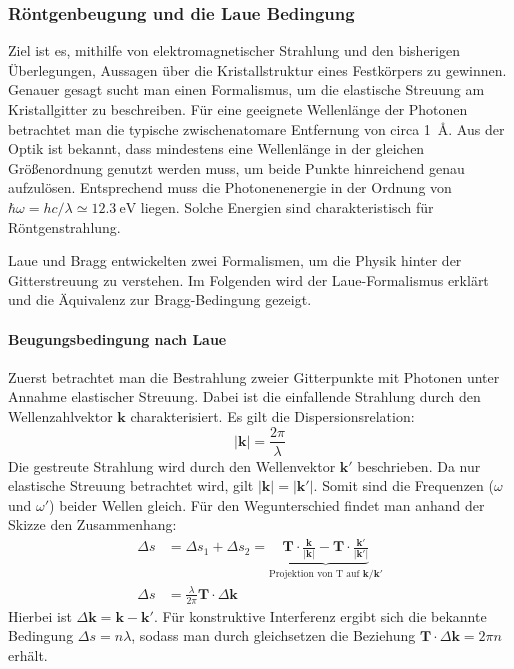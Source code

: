 \subsubsection{Röntgenbeugung und die Laue Bedingung}
Ziel ist es, mithilfe von elektromagnetischer Strahlung und den bisherigen Überlegungen, Aussagen über die Kristallstruktur
eines Festkörpers zu gewinnen.
Genauer gesagt sucht man einen Formalismus, um die elastische Streuung am Kristallgitter zu beschreiben.
Für eine geeignete Wellenlänge der Photonen betrachtet man die typische zwischenatomare Entfernung von circa
\qty{1}{\angstrom}.
Aus der Optik ist bekannt, dass mindestens eine Wellenlänge in der gleichen Größenordnung genutzt werden
muss, um beide Punkte hinreichend genau aufzulösen.
Entsprechend muss die Photonenenergie in der Ordnung von
$\hbar \omega=hc / \lambda \simeq \qty{12.3}{\electronvolt}$ liegen.
Solche Energien sind charakteristisch für Röntgenstrahlung.
\autocite[115]{Ashcroft}

Laue und Bragg entwickelten zwei Formalismen, um die Physik hinter der Gitterstreuung zu verstehen. Im Folgenden wird der
Laue-Formalismus erklärt und die Äquivalenz zur Bragg-Bedingung gezeigt.

\paragraph{Beugungsbedingung nach Laue}
Zuerst betrachtet man die Bestrahlung zweier Gitterpunkte mit Photonen unter Annahme elastischer Streuung.
Dabei ist die einfallende Strahlung durch den Wellenzahlvektor  $\mathbf{k}$ charakterisiert.
Es gilt die Dispersionsrelation:
\begin{equation*}
    \lvert \mathbf{k} \rvert =\frac{2\pi}{\lambda}
\end{equation*}
Die gestreute Strahlung wird durch den Wellenvektor $\mathbf{k}'$ beschrieben.
Da nur elastische Streuung betrachtet wird, gilt $\lvert \mathbf{k} \rvert=\lvert \mathbf{k}' \rvert$.
Somit sind die Frequenzen ($\omega$ und $\omega'$) beider Wellen gleich.
Für den Wegunterschied findet man anhand der Skizze den Zusammenhang:
\begin{align*}
    \Delta s &= \Delta s_{1} + \Delta s_{2} = \underbrace{ \mathbf{T} \cdot \frac{\mathbf{k}}{\lvert \mathbf{k} \rvert }-
    \mathbf{T}\cdot \frac{\mathbf{k}'}{\lvert \mathbf{k}' \rvert}  }_{ \text{Projektion von T auf }
    \mathbf{k}/\mathbf{k'} } \\
    \Delta s &=  \frac{\lambda}{2\pi} \mathbf{T}\cdot\Delta \mathbf{k}
\end{align*}
Hierbei ist $\Delta \mathbf{k} = \mathbf{k}-\mathbf{k}'$.
Für konstruktive Interferenz ergibt sich die bekannte Bedingung $\Delta s = n \lambda$, sodass man durch gleichsetzen
die Beziehung $\mathbf{T}\cdot\Delta \mathbf{k} =2\pi n$ erhält.

